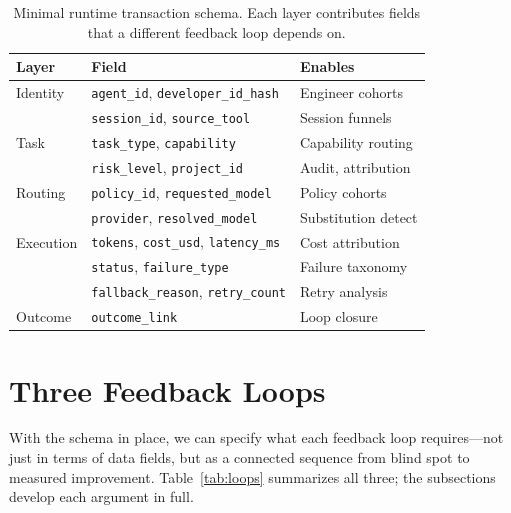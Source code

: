 \documentclass[sigconf,anonymous,review]{acmart}
\begin{document}
\begin{table}[t]
\caption{Minimal runtime transaction schema. Each layer contributes
  fields that a different feedback loop depends on.}
\label{tab:schema}
\small
\begin{tabular}{@{}p{1.2cm}p{3.2cm}p{2.25cm}@{}}
\toprule
\textbf{Layer} & \textbf{Field} & \textbf{Enables} \\
\midrule
Identity   & \texttt{agent\_id}, \texttt{developer\_id\_hash}       & Engineer cohorts \\
           & \texttt{session\_id}, \texttt{source\_tool}            & Session funnels \\
Task       & \texttt{task\_type}, \texttt{capability}               & Capability routing \\
           & \texttt{risk\_level}, \texttt{project\_id}             & Audit, attribution \\
Routing    & \texttt{policy\_id}, \texttt{requested\_model}         & Policy cohorts \\
           & \texttt{provider}, \texttt{resolved\_model}            & Substitution detect \\
Execution  & \texttt{tokens}, \texttt{cost\_usd}, \texttt{latency\_ms} & Cost attribution \\
           & \texttt{status}, \texttt{failure\_type}                & Failure taxonomy \\
           & \texttt{fallback\_reason}, \texttt{retry\_count}       & Retry analysis \\
Outcome    & \texttt{outcome\_link}                                 & Loop closure \\
\bottomrule
\end{tabular}
\end{table}

\section{Three Feedback Loops}
\label{sec:loops}

With the schema in place, we can specify what each feedback loop
requires---not just in terms of data fields, but as a connected
sequence from blind spot to measured improvement. Table~\ref{tab:loops}
summarizes all three; the subsections develop each argument in full.
\end{document}
